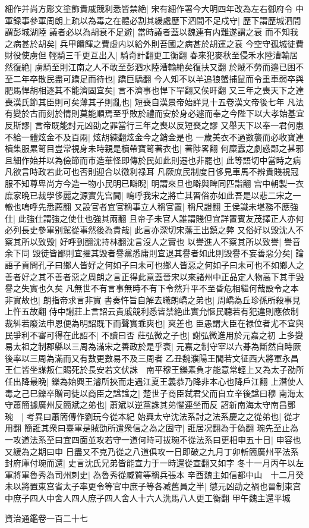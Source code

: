 細作并尚方彫文塗飾貴戚競利悉皆禁絶|{
	宋有細作署今大明四年改為左右御府令}
中軍録事參軍周朗上疏以為毒之在體必割其緩處歷下泗間不足戍守|{
	歷下謂歷城泗間謂彭城湖陸}
議者必以為胡衰不足避|{
	當時議者蓋以魏連有内難遂謂之衰}
而不知我之病甚於胡矣|{
	兵甲饋餫之費虚内以給外則吾國之病甚於胡運之衰}
今空守孤城徒費財役使虜但輕騎三千更互出入|{
	騎奇計翻更工衡翻}
春來犯麥秋至侵禾水陸漕輸居然復絶|{
	虜騎至則江南之人不敢至彭泗水陸漕輸絶矣復扶又翻}
於賊不勞而邉已困不至二年卒散民盡可蹻足而待也|{
	蹻巨驕翻}
今人知不以羊追狼蟹捕鼠而令重車弱卒與肥馬悍胡相逐其不能濟固宜矣|{
	言不濟事也悍下罕翻又侯旰翻}
又三年之喪天下之達喪漢氏節其臣則可矣薄其子則亂也|{
	短喪自漢景帝始詳見十五卷漢文帝後七年}
凡法有變於古而刻於情則莫能順焉至乎敗於禮而安於身必遽而奉之今陛下以大孝始基宜反斯謬|{
	言帝既能討元凶劭之罪當行三年之喪以反短喪之謬}
又舉天下以奉一君何患不給一體炫金不及百兩|{
	炫胡練翻炫金今之銷金是也}
一歲美衣不過數襲而必收寶連櫝集服累笥目豈常視身未時親是櫝帶寶笥著衣也|{
	著陟畧翻}
何糜蠧之劇惑鄙之甚邪且細作始并以為儉節而市造華怪即傳於民如此則遷也非罷也|{
	此等語切中當時之病凡欲言時政若此可也否則迎合以徼利禄耳}
凡厥庶民制度日侈見車馬不辨貴賤視冠服不知尊卑尚方今造一物小民明已䁹睨|{
	明謂來旦也䁹與睥同匹詣翻}
宫中朝製一衣庶家晩已裁學侈麗之源實先宫閫|{
	嗚呼我宋之將亡其習俗亦如此吾是以悲二宋之一轍也嗚呼先悉薦翻}
又設官者宜官稱事立人稱官置|{
	稱尺證翻}
王侯識未堪務不應強仕|{
	此強仕謂強之使仕也強其兩翻}
且帝子未官人誰謂賤但宜詳置賓友茂擇正人亦何必列長史參軍别駕從事然後為貴哉|{
	此言亦深切宋藩王出鎮之弊}
又俗好以毁沈人不察其所以致毁|{
	好呼到翻沈持林翻沈言沒人之實也}
以譽進人不察其所以致譽|{
	譽音余下同}
毁徒皆鄙則宜擢其毁者譽黨悉庸則宜退其譽者如此則毁譽不妄善惡分矣|{
	論語子貢問孔子曰鄉人皆好之何如子曰未可也鄉人皆惡之何如子曰未可也不如鄉人之善者好之其不善者惡之周朗之言正得此意蓋晉宋以來諸州中正品定人物高下其手毀譽之失實也久矣}
凡無世不有言事無時不有下令然升平不至昏危相繼何哉設令之本非實故也|{
	朗指帝求言非實}
書奏忤旨自解去職朗嶠之弟也|{
	周嶠為丘珍孫所殺事見上忤五故翻}
侍中謝莊上言詔云貴戚競利悉皆禁絶此實允愜民聽若有犯違則應依制裁糾若廢法申恩便為明詔既下而聲實乖爽也|{
	爽差也}
臣愚謂大臣在禄位者尤不宜與民爭利不審可得在此詔不|{
	不讀曰否}
莊弘微之子也|{
	謝弘微進用於元嘉之初}
上多變易太祖之制郡縣以三周為滿宋之善政於是乎衰|{
	元嘉之制守宰以六朞為斷然自時厥後率以三周為滿而又有數更數易不及三周者}
乙丑魏濮陽王閭若文征西大將軍永昌王仁皆坐謀叛仁賜死於長安若文伏誅　南平穆王鑠素負才能意常輕上又為太子劭所任出降最晩|{
	鑠為始興王濬所挾而走遇江夏王義恭乃降非本心也降戶江翻}
上潛使人毒之己巳鑠卒贈司徒以商臣之諡諡之|{
	楚世子商臣弑君父而自立辛後諡曰穆}
南海太守蕭簡據廣州反簡斌之弟也|{
	蕭斌以逆黨誅其弟懼連坐而反}
詔新南海太守南昌鄧琬　|{
	考異曰蕭簡傳作劉玩今從本紀}
始興太守沈法系討之法系慶之之從弟也|{
	從才用翻}
簡誑其衆曰臺軍是賊劭所遣衆信之為之固守|{
	誑居况翻為于偽翻}
琬先至止為一攻道法系至曰宜四面並攻若守一道何時可拔琬不從法系曰更相申五十日|{
	申容也又緩為之期曰申}
日盡又不克乃從之八道俱攻一日即破之九月丁卯斬簡廣州平法系封府庫付琬而還|{
	史言沈氏兄弟皆能宣力于一時還從宣翻又如字}
冬十一月丙午以左軍將軍魯秀為司州刺史|{
	為魯秀從臧質等稱兵張本}
辛酉魏主如信都中山　十二月癸未以將置東宫省太子率更令等官中庶子等各减舊員之半|{
	懲元凶劭之禍也晉制東宫中庶子四人中舍人四人庶子四人舍人十六人洗馬八人更工衡翻}
甲午魏主還平城

資治通鑑卷一百二十七
